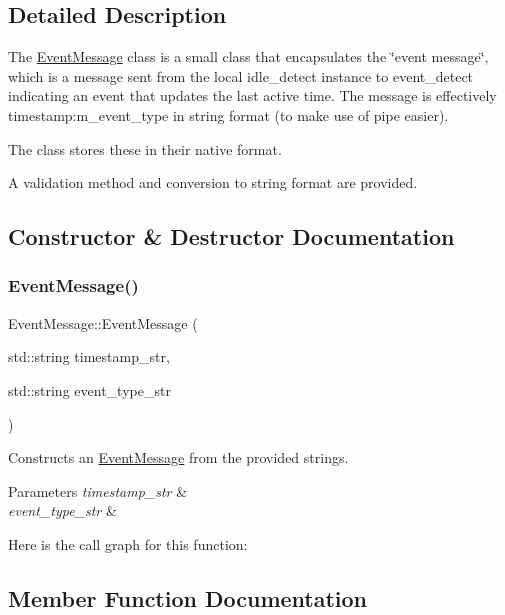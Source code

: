 \subsection{Detailed Description}
The \mbox{\hyperlink{classEventMessage}{Event\+Message}} class is a small class that encapsulates the \char`\"{}event message\char`\"{}, which is a message sent from the local idle\+\_\+detect instance to event\+\_\+detect indicating an event that updates the last active time. The message is effectively timestamp\+:m\+\_\+event\+\_\+type in string format (to make use of pipe easier). 

The class stores these in their native format.

A validation method and conversion to string format are provided. 

\subsection{Constructor \& Destructor Documentation}
\mbox{\label{classEventMessage_ae9314c9140aec416b1e403c2ec3dad25}} 
\subsubsection{\texorpdfstring{Event\+Message()}{EventMessage()}}
{\footnotesize\ttfamily Event\+Message\+::\+Event\+Message (\begin{DoxyParamCaption}\item[{std\+::string}]{timestamp\+\_\+str,  }\item[{std\+::string}]{event\+\_\+type\+\_\+str }\end{DoxyParamCaption})}



Constructs an \mbox{\hyperlink{classEventMessage}{Event\+Message}} from the provided strings. 


\begin{DoxyParams}{Parameters}
{\em timestamp\+\_\+str} & \\
\hline
{\em event\+\_\+type\+\_\+str} & \\
\hline
\end{DoxyParams}
Here is the call graph for this function\+:


\subsection{Member Function Documentation}
\mbox{\label{classEventMessage_aa4656857adf12d74bd0ba9c04e2ee539}} 
